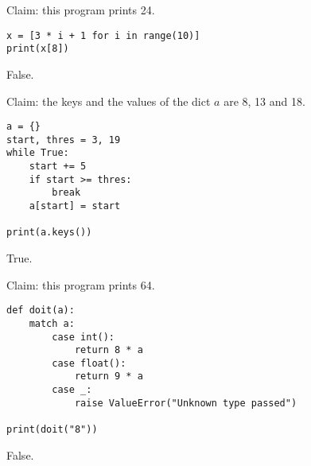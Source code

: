 \documentclass[stochastic-or.tex]{subfiles}
\begin{document}
\begin{truefalse}
Claim: this program prints 24.
\begin{verbatim}
x = [3 * i + 1 for i in range(10)]
print(x[8])
\end{verbatim}
\begin{solution}
        False.
\end{solution}
\end{truefalse}

\begin{truefalse}
Claim: the keys and the values of the dict $a$ are 8, 13 and 18.
\begin{verbatim}
a = {}
start, thres = 3, 19
while True:
    start += 5
    if start >= thres:
        break
    a[start] = start

print(a.keys())
\end{verbatim}
\begin{solution}
        True.
\end{solution}
\end{truefalse}


\begin{truefalse}
Claim: this program prints 64.
\begin{verbatim}
def doit(a):
    match a:
        case int():
            return 8 * a
        case float():
            return 9 * a
        case _:
            raise ValueError("Unknown type passed")

print(doit("8"))
\end{verbatim}
\begin{solution}
        False.
\end{solution}
\end{truefalse}
\end{document}
